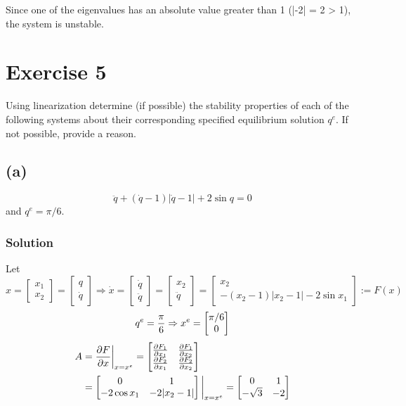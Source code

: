 \documentclass[12pt,a4paper]{article}
\begin{document}
	Since one of the eigenvalues has an absolute value greater than 1 (|-2| = 2 > 1), the system is unstable.
	
	
	\section*{Exercise 5}
	Using linearization determine (if possible) the stability properties of each of the following systems about their corresponding specified equilibrium solution $q^{e}$. If not possible, provide a reason.
	
	\subsection*{(a)}
	\[
	\ddot{q} + (\dot{q}-1)|\dot{q}-1| + 2\sin q = 0
	\]
	and $q^{e}=\pi/6$.
	
	
	
	\subsubsection*{Solution}
	
	Let $x = \begin{bmatrix}
		x_1 \\ x_2
	\end{bmatrix} = \begin{bmatrix}
	q \\ \dot q
	\end{bmatrix} \Rightarrow \dot x = \begin{bmatrix}
	\dot q \\ \ddot q
	\end{bmatrix} = \begin{bmatrix}
	x_2 \\ \ddot q
	\end{bmatrix}  = \begin{bmatrix}
	x_2 \\ -(x_2 - 1) | x_2 - 1 | -2\sin x_1
	\end{bmatrix} := F(x)$	
	\[
	q^e = {\pi\over6} \Rightarrow x^e = \begin{bmatrix}
		{\pi/6} \\ 0
	\end{bmatrix}
	\]
	\begin{align*}
	A &= {\partial F \over \partial x}\bigg|_{x = x^e} = \begin{bmatrix}
	{\partial F_1 \over \partial x_1} & {\partial F_1 \over \partial x_2 } \\ 
	{\partial F_2 \over \partial x_1} & {\partial F_2 \over \partial x_2}	
	\end{bmatrix} \\ 
	&= \begin{bmatrix}
		0 & 1 \\ -2\cos x_1 & -2|x_2 -1|
	\end{bmatrix}\bigg|_{x = x^e} = \begin{bmatrix}
	0 & 1 \\ -\sqrt3 & -2
	\end{bmatrix}
	\end{align*}
	
\end{document}
